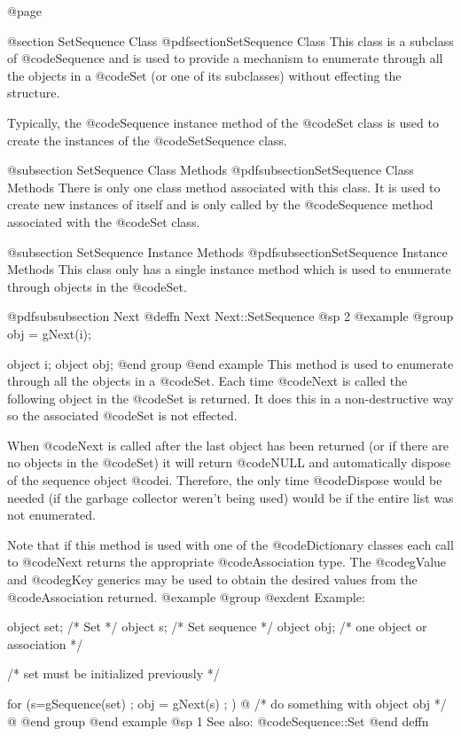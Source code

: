 @page

@section SetSequence Class
@pdfsection{SetSequence Class}
This class is a subclass of @code{Sequence} and is used to provide a
mechanism to enumerate through all the objects in a @code{Set} (or one
of its subclasses) without effecting the structure.

Typically, the @code{Sequence} instance method of the @code{Set} class
is used to create the instances of the @code{SetSequence} class.  



@subsection SetSequence Class Methods
@pdfsubsection{SetSequence Class Methods}
There is only one class method associated with this class.  It is used
to create new instances of itself and is only called by the @code{Sequence}
method associated with the @code{Set} class.

@subsection SetSequence Instance Methods
@pdfsubsection{SetSequence Instance Methods}
This class only has a single instance method which is used to enumerate
through objects in the @code{Set}.






@pdfsubsubsection {Next}
@deffn {Next} Next::SetSequence
@sp 2
@example
@group
obj = gNext(i);

object  i;
object  obj;
@end group
@end example
This method is used to enumerate through all the objects in a @code{Set}.
Each time @code{Next} is called the following object in the @code{Set}
is returned.  It does this in a non-destructive way so the associated
@code{Set} is not effected.

When @code{Next} is called after the last object has been returned (or
if there are no objects in the @code{Set}) it will return @code{NULL} and
automatically dispose of the sequence object @code{i}.  Therefore,
the only time @code{Dispose} would be needed (if the garbage collector
weren't being used) would be if the entire list was not enumerated.

Note that if this method is used with one of the @code{Dictionary} classes
each call to @code{Next} returns the appropriate @code{Association} type.
The @code{gValue} and @code{gKey} generics may be used to obtain
the desired values from the @code{Association} returned.
@example
@group
@exdent Example:

object  set;  /*  Set                        */
object  s;    /*  Set sequence               */
object  obj;  /*  one object or association  */

/*  set must be initialized previously  */

for (s=gSequence(set) ; obj = gNext(s) ; )  @{
        /*  do something with object obj  */
@}
@end group
@end example
@sp 1
See also:  @code{Sequence::Set}
@end deffn



